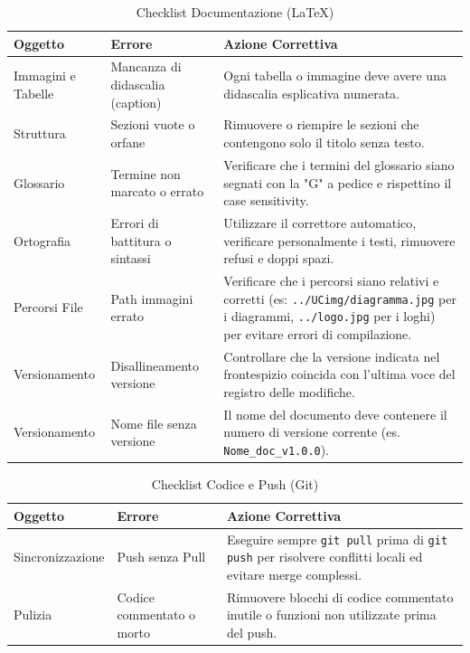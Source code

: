 \documentclass[11pt,a4paper]{article}
\begin{document}
\begin{table}[H]
    \centering
    \renewcommand{\arraystretch}{1.4}
    \begin{tabular}{|l|>{\raggedright\arraybackslash}p{}|>{\raggedright\arraybackslash}p{}|}
        \hline
        \textbf{Oggetto} & \textbf{Errore} & \textbf{Azione Correttiva} \\
        \hline
        Immagini e Tabelle & Mancanza di didascalia (caption) & Ogni tabella o immagine deve avere una didascalia esplicativa numerata. \\
        \hline
        Struttura & Sezioni vuote o orfane & Rimuovere o riempire le sezioni che contengono solo il titolo senza testo. \\
        \hline
        Glossario & Termine non marcato o errato & Verificare che i termini del glossario siano segnati con la "G" a pedice e rispettino il case sensitivity. \\
        \hline
        Ortografia & Errori di battitura o sintassi & Utilizzare il correttore automatico, verificare personalmente i testi, rimuovere refusi e doppi spazi. \\
        \hline
        Percorsi File & Path immagini errato & Verificare che i percorsi siano relativi e corretti (es: \texttt{../UCimg/diagramma.jpg} per i diagrammi, \texttt{../logo.jpg} per i loghi) per evitare errori di compilazione.\\
        \hline
        Versionamento & Disallineamento versione & Controllare che la versione indicata nel frontespizio coincida con l'ultima voce del registro delle modifiche. \\
        \hline
        Versionamento & Nome file senza versione & Il nome del documento deve contenere il numero di versione corrente (es. \texttt{Nome\_doc\_v1.0.0}). \\
        \hline
    \end{tabular}
    \caption{Checklist Documentazione (LaTeX)}
\end{table}

\begin{table}[H]
    \centering
    \renewcommand{\arraystretch}{1.4}
    \begin{tabular}{|l|>{\raggedright\arraybackslash}p{}|>{\raggedright\arraybackslash}p{}|}
        \hline
        \textbf{Oggetto} & \textbf{Errore} & \textbf{Azione Correttiva} \\
        \hline
        Sincronizzazione & Push senza Pull & Eseguire sempre \texttt{git pull} prima di \texttt{git push} per risolvere conflitti locali ed evitare merge complessi. \\
        \hline
        Pulizia & Codice commentato o morto & Rimuovere blocchi di codice commentato inutile o funzioni non utilizzate prima del push. \\
        \hline
    \end{tabular}
    \caption{Checklist Codice e Push (Git)}
\end{table}
\end{document}
